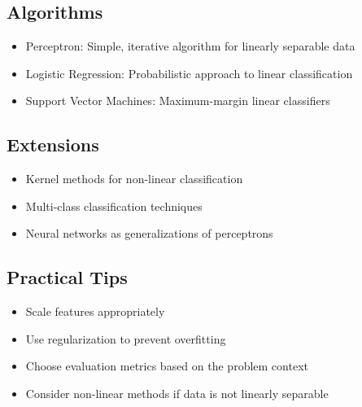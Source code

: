 \documentclass{article}
\begin{document}
\subsection{Algorithms}
\begin{itemize}
    \item Perceptron: Simple, iterative algorithm for linearly separable data
    \item Logistic Regression: Probabilistic approach to linear classification
    \item Support Vector Machines: Maximum-margin linear classifiers
\end{itemize}

\subsection{Extensions}
\begin{itemize}
    \item Kernel methods for non-linear classification
    \item Multi-class classification techniques
    \item Neural networks as generalizations of perceptrons
\end{itemize}

\subsection{Practical Tips}
\begin{itemize}
    \item Scale features appropriately
    \item Use regularization to prevent overfitting
    \item Choose evaluation metrics based on the problem context
    \item Consider non-linear methods if data is not linearly separable
\end{itemize}
\end{document}
